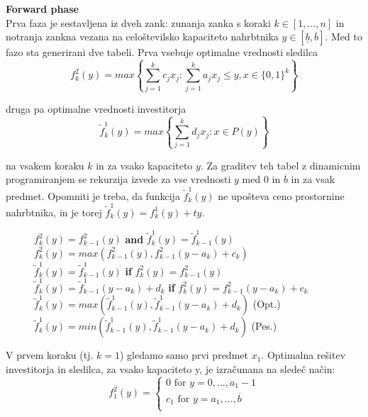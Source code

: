 \documentclass[a4paper, 11pt]{article}
\begin{document}
	\textbf{Forward phase} \\
	Prva faza je sestavljena iz dveh zank: zunanja zanka s koraki $k \in \left[1, \dots , n \right]$ in notranja zankna vezana na celoštevilsko kapaciteto nahrbtnika $y \in \left[ \underline{b}, \overline{b} \right]$. Med to fazo sta generirani dve tabeli. Prva vsebuje optimalne vrednosti sledilca
	$$ f^{2}_{k}(y) = max \left\{ \sum_{j=1}^{k} c_j x_j : \sum_{j=1}^{k} a_j x_j \leq y, x \in \{0, 1\}^k \right\} $$
	
	druga pa optimalne vrednosti investitorja
	$$ \widetilde{f}^{1}_{k}(y) = max \left\{ \sum_{j=1}^{k} d_j x_j : x \in P(y) \right\} $$
	
	na vsakem koraku $k$ in za vsako kapaciteto $y$. Za graditev teh tabel z dinamicnim programiranjem se rekurzija izvede za vse vrednosti $y$ med $0$ in $\overline{b}$ in za vsak predmet. Opomniti je treba, da funkcija  $\widetilde{f}^{1}_{k}(y)$ ne upošteva ceno prostornine nahrbtnika, in je torej   $\widetilde{f}^{1}_{k}(y) = f^{1}_{k}(y)+ty$. \\

	\begin{figure}[ht]
  	\centering
  		\begin{minipage}{0.9\linewidth}
			\begin{algorithmic}[1]
						\STATE $f_{k}^{2}(y) = f_{k-1}^{2}(y)$ \textbf{and} $\widetilde{f}_{k}^{1}(y) = \widetilde{f}_{k-1}^{1}(y)$
					\ELSE
						\STATE $f_{k}^{2}(y) = max( f_{k-1}^{2}(y), f_{k-1}^{2}(y - a_k) + c_k)$
							\STATE $\widetilde{f}^{1}_{k}(y) = \widetilde{f}^{1}_{k-1}(y)$ \textbf{if} $f_{k}^{2}(y) = f_{k-1}^{2}(y)$
							\STATE $\widetilde{f}^{1}_{k}(y) = \widetilde{f}^{1}_{k-1}(y-a_k) + d_k$ \textbf{if} $f_{k}^{2}(y) = f_{k-1}^{2}(y - a_k) + c_k$
						\ELSE
							\STATE $\widetilde{f}^{1}_{k}(y) = max(\widetilde{f}^{1}_{k-1}(y), \widetilde{f}^{1}_{k-1}(y-a_k) + d_k)$ (Opt.)
							\STATE $\widetilde{f}^{1}_{k}(y) = min(\widetilde{f}^{1}_{k-1}(y), \widetilde{f}^{1}_{k-1}(y-a_k) + d_k)$ (Pes.)
						\ENDIF
					\ENDIF
				\ENDFOR
			\end{algorithmic}
		\end{minipage}
	\end{figure}
	
	V prvem koraku (tj. $k=1$) gledamo samo prvi predmet $x_1$. Optimalna rešitev investitorja in sledilca, za vsako kapaciteto y, je izračunana na sledeč način:
	\[   
	\text{$f_{1}^{2}(y) =$}
    	\begin{cases}
	 	\text{0 for $y = 0, \dots, a_1 - 1$} \\
       		\text{$c_1$ for $y = a_1, \dots, \overline{b}$} \\
    	\end{cases}
	\]
	
\end{document}
